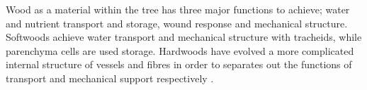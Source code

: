Wood as a material within the tree has three major functions to achieve; water
and nutrient transport and storage, wound response and mechanical structure. Softwoods
achieve water transport and mechanical structure with tracheids, while
parenchyma cells are used storage. Hardwoods have evolved a more
complicated internal structure of vessels and fibres in order to separates out
the functions of transport and mechanical support respectively \cite{walker1993primary}.